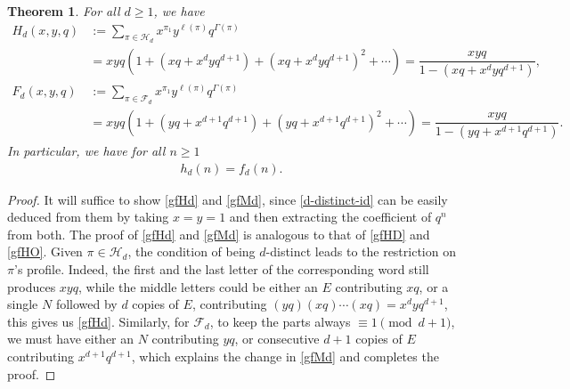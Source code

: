 \documentclass[12pt]{amsart}
\numberwithin{equation}{section}
\theoremstyle{plain}
\newtheorem{theorem}{Theorem}[section]
\theoremstyle{definition}
\def\F{\mathcal{F}}
\def\H{\mathcal{H}}
\begin{document}
\begin{theorem}
For all $d\geq 1$, we have
\begin{align}
H_d(x,y,q) &:=\sum\limits_{\pi\in\H_d}x^{\pi_1}y^{\ell(\pi)}q^{\Gamma(\pi)}\label{gfHd}\\
&=xyq(1+(xq+x^dyq^{d+1})+(xq+x^dyq^{d+1})^2+\cdots)=\dfrac{xyq}{1-(xq+x^dyq^{d+1})},\nonumber \\
F_d(x,y,q) &:=\sum\limits_{\pi\in\F_d}x^{\pi_1}y^{\ell(\pi)}q^{\Gamma(\pi)}\label{gfMd}\\
&=xyq(1+(yq+x^{d+1}q^{d+1})+(yq+x^{d+1}q^{d+1})^2+\cdots)=\dfrac{xyq}{1-(yq+x^{d+1}q^{d+1})}.\nonumber
\end{align}
In particular, we have for all $n\geq 1$
\begin{align}\label{d-distinct-id}
h_d(n)=f_d(n).
\end{align}
\end{theorem}
\begin{proof}
It will suffice to show \eqref{gfHd} and \eqref{gfMd}, since \eqref{d-distinct-id} can be easily deduced from them by taking $x=y=1$ and then extracting the coefficient of $q^n$ from both. The proof of \eqref{gfHd} and \eqref{gfMd} is analogous to that of \eqref{gfHD} and \eqref{gfHO}. Given $\pi\in\H_d$, the condition of being $d$-distinct leads to the restriction on $\pi$'s profile. Indeed, the first and the last letter of the corresponding word still produces $xyq$, while the middle letters could be either an $E$ contributing $xq$, or a single $N$ followed by $d$ copies of $E$, contributing $(yq)(xq)\cdots(xq)=x^dyq^{d+1}$, this gives us \eqref{gfHd}. Similarly, for $\F_d$, to keep the parts always $\equiv 1 \pmod{d+1}$, we must have either an $N$ contributing $yq$, or consecutive $d+1$ copies of $E$ contributing $x^{d+1}q^{d+1}$, which explains the change in \eqref{gfMd} and completes the proof.
\end{proof}
\end{document}
